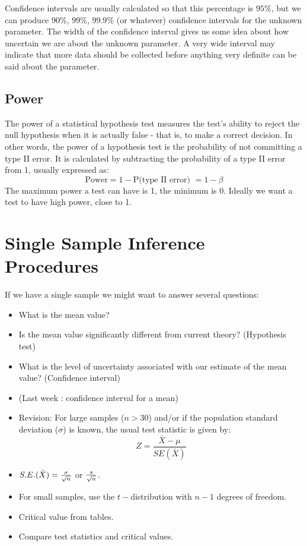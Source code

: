 \documentclass[a4paper,12pt]{article}
\begin{document}
Confidence intervals are usually calculated so that this percentage is $95\%$, but we can produce $90\%$, $99\%$, $99.9\%$ (or whatever) confidence intervals for the unknown parameter. The width of the confidence interval gives us some idea about how uncertain we are about the unknown parameter. A very wide interval may indicate that more data should be collected before anything very definite can be said about the parameter.
\subsection{Power }
The power of a statistical hypothesis test measures the test's ability to reject the null hypothesis when it is actually false - that is, to make a correct decision. In other words, the power of a hypothesis test is the probability of not committing a type II error. It is calculated by subtracting the probability of a type II error from 1, usually expressed as: 
\[\mbox{Power} = 1 - \mbox{P(type II error) } = 1- \beta \]The maximum power a test can have is 1, the minimum is 0. Ideally we want a test to have high power, close to 1.

\section{Single Sample Inference Procedures}
If we have a single sample we might want to answer several
questions:
\begin{itemize}
	\item What is the mean value? \item Is the mean value
	significantly different from current theory? (Hypothesis test)
	\item What is the level of uncertainty associated with our
	estimate of the mean value? (Confidence interval)
\end{itemize}

\begin{itemize}
	\item (Last week : confidence interval for a mean) \item Revision:
	For large samples ($n > 30$) and/or if the population standard
	deviation ($\sigma$) is known, the usual test statistic is given
	by: \[Z =\frac{\bar{X} - \mu}{SE(\bar{X})}\]
	
	\item $S.E.(\bar{X}) = { \sigma \over \sqrt{n}} $ or ${s \over \sqrt{n}}$. 
	\item For small samples, use the $t-$distribution with $n-1$ degrees of freedom.
	\item Critical value from tables.
	\item Compare test statistics and critical values.
\end{itemize}
\end{document}
